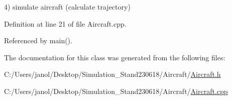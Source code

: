 4) simulate aircraft (calculate trajectory) 

Definition at line 21 of file Aircraft.\+cpp.



Referenced by main().



The documentation for this class was generated from the following files\+:\begin{DoxyCompactItemize}
\item 
C\+:/\+Users/janol/\+Desktop/\+Simulation\+\_\+\+Stand230618/\+Aircraft/\hyperlink{_aircraft_8h}{Aircraft.\+h}\item 
C\+:/\+Users/janol/\+Desktop/\+Simulation\+\_\+\+Stand230618/\+Aircraft/\hyperlink{_aircraft_8cpp}{Aircraft.\+cpp}\end{DoxyCompactItemize}
